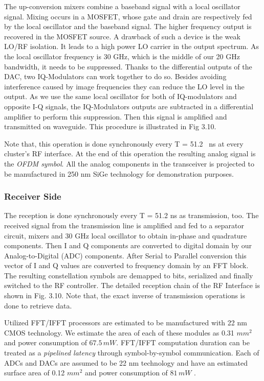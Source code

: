 The up-conversion mixers combine a baseband signal with a local oscillator signal. Mixing occurs in a MOSFET, whose gate and drain are respectively fed by the local oscillator and the baseband signal. The higher frequency output is recovered in the MOSFET source. A drawback of such a device is the weak LO/RF isolation. It leads to a high power LO carrier in the output spectrum. As the local oscillator frequency is 30 GHz, which is the middle of our 20 GHz bandwidth, it needs to be suppressed. Thanks to the differential outputs of the DAC, two IQ-Modulators can work together to do so. Besides avoiding interference caused by image frequencies they can reduce the LO level in the output. As we use the same local oscillator for both of IQ-modulators and opposite I-Q signals, the IQ-Modulators outputs are subtracted in a differential amplifier to perform this suppression. Then this signal is amplified and transmitted on waveguide. This procedure is illustrated in Fig 3.10.      


Note that, this operation is done synchronously every T = 51.2 \, ns at every cluster's RF interface. At the end of this operation the resulting analog signal is the \textit{OFDM symbol}. All the analog components in the transceiver is projected to be manufactured in 250 nm SiGe technology for demonstration purposes. 

\subsubsection{Receiver Side}

The reception is done synchronously every T = 51.2 ns as transmission, too. The received signal from the transmission line is amplified and fed to a separator circuit, mixers and 30 GHz local oscillator to obtain in-phase and quadrature components. Then I and Q components are converted to digital domain by our Analog-to-Digital (ADC) components. After Serial to Parallel conversion this vector of I and Q values are converted to frequency domain by an FFT block. The resulting constellation symbols are demapped to bits, serialized and finally switched to the RF controller. The detailed reception chain of the RF Interface is shown in Fig. 3.10. Note that, the exact inverse of transmission operations is done to retrieve data.

Utilized FFT/IFFT processors are estimated to be manufactured with 22 nm CMOS technology. We estimate the area of each of these modules as 0.31 $mm^2$ and power consumption of $67.5 \, mW$. FFT/IFFT computation duration can be treated as a \textit{pipelined latency} through symbol-by-symbol communication. Each of ADCs and DACs are assumed to be 22 nm technology and have an estimated surface area of 0.12 $mm^2$ and power consumption of $81 \, mW$ \cite{briere2015dynamically}. 




